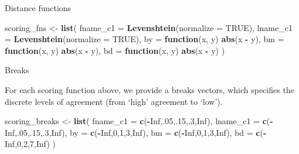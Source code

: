 \documentclass[
  ignorenonframetext,
]{beamer}
\newenvironment{Shaded}{\begin{snugshade}}{\end{snugshade}}
\newcommand{\ControlFlowTok}[1]{\textcolor[rgb]{0.13,0.29,0.53}{\textbf{#1}}}
\newcommand{\DataTypeTok}[1]{\textcolor[rgb]{0.13,0.29,0.53}{#1}}
\newcommand{\DecValTok}[1]{\textcolor[rgb]{0.00,0.00,0.81}{#1}}
\newcommand{\KeywordTok}[1]{\textcolor[rgb]{0.13,0.29,0.53}{\textbf{#1}}}
\newcommand{\NormalTok}[1]{#1}
\newcommand{\OperatorTok}[1]{\textcolor[rgb]{0.81,0.36,0.00}{\textbf{#1}}}
\newcommand{\OtherTok}[1]{\textcolor[rgb]{0.56,0.35,0.01}{#1}}
\newcommand{\StringTok}[1]{\textcolor[rgb]{0.31,0.60,0.02}{#1}}
\begin{document}
\begin{frame}[fragile]{Distance functions}
\protect\hypertarget{distance-functions}{}

\begin{Shaded}
\begin{Highlighting}[]
\NormalTok{scoring_fns <-}\StringTok{ }\KeywordTok{list}\NormalTok{(}
  \DataTypeTok{fname_c1 =} \KeywordTok{Levenshtein}\NormalTok{(}\DataTypeTok{normalize =} \OtherTok{TRUE}\NormalTok{),}
  \DataTypeTok{lname_c1 =} \KeywordTok{Levenshtein}\NormalTok{(}\DataTypeTok{normalize =} \OtherTok{TRUE}\NormalTok{),}
  \DataTypeTok{by =} \ControlFlowTok{function}\NormalTok{(x, y) }\KeywordTok{abs}\NormalTok{(x }\OperatorTok{-}\StringTok{ }\NormalTok{y),}
  \DataTypeTok{bm =} \ControlFlowTok{function}\NormalTok{(x, y) }\KeywordTok{abs}\NormalTok{(x }\OperatorTok{-}\StringTok{ }\NormalTok{y),}
  \DataTypeTok{bd =} \ControlFlowTok{function}\NormalTok{(x, y) }\KeywordTok{abs}\NormalTok{(x }\OperatorTok{-}\StringTok{ }\NormalTok{y)}
\NormalTok{)}
\end{Highlighting}
\end{Shaded}

\end{frame}

\begin{frame}[fragile]{Breaks}
\protect\hypertarget{breaks}{}

For each scoring function above, we provide a breaks vectors, which
specifies the discrete levels of agreement (from `high' agreement to
`low').

\begin{Shaded}
\begin{Highlighting}[]
\NormalTok{scoring_breaks <-}\StringTok{ }\KeywordTok{list}\NormalTok{(}
  \DataTypeTok{fname_c1 =} \KeywordTok{c}\NormalTok{(}\OperatorTok{-}\OtherTok{Inf}\NormalTok{,.}\DecValTok{05}\NormalTok{,.}\DecValTok{15}\NormalTok{,.}\DecValTok{3}\NormalTok{,}\OtherTok{Inf}\NormalTok{),}
  \DataTypeTok{lname_c1 =} \KeywordTok{c}\NormalTok{(}\OperatorTok{-}\OtherTok{Inf}\NormalTok{,.}\DecValTok{05}\NormalTok{,.}\DecValTok{15}\NormalTok{,.}\DecValTok{3}\NormalTok{,}\OtherTok{Inf}\NormalTok{),}
  \DataTypeTok{by =} \KeywordTok{c}\NormalTok{(}\OperatorTok{-}\OtherTok{Inf}\NormalTok{,}\DecValTok{0}\NormalTok{,}\DecValTok{1}\NormalTok{,}\DecValTok{3}\NormalTok{,}\OtherTok{Inf}\NormalTok{),}
  \DataTypeTok{bm =} \KeywordTok{c}\NormalTok{(}\OperatorTok{-}\OtherTok{Inf}\NormalTok{,}\DecValTok{0}\NormalTok{,}\DecValTok{1}\NormalTok{,}\DecValTok{3}\NormalTok{,}\OtherTok{Inf}\NormalTok{),}
  \DataTypeTok{bd =} \KeywordTok{c}\NormalTok{(}\OperatorTok{-}\OtherTok{Inf}\NormalTok{,}\DecValTok{0}\NormalTok{,}\DecValTok{2}\NormalTok{,}\DecValTok{7}\NormalTok{,}\OtherTok{Inf}\NormalTok{)}
\NormalTok{)}
\end{Highlighting}
\end{Shaded}

\end{frame}
\end{document}
